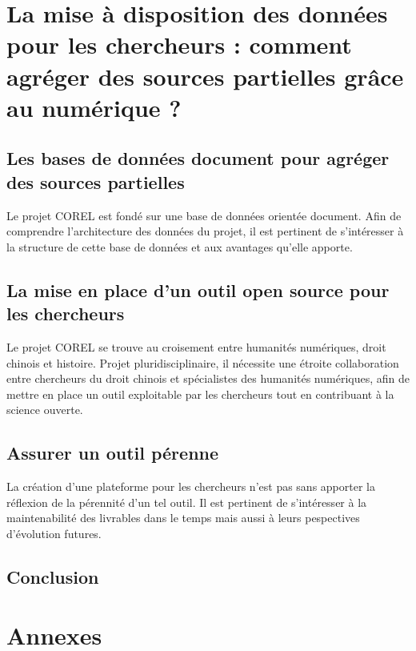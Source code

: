 \documentclass[a4paper,12pt,twoside]{book}
\newcommand{\COREL}{\gls{COREL}\xspace}
\newcommand{\clearemptydoublepage}{\newpage{\pagestyle{empty}\cleardoublepage}}
\newcommand\chapterNo[1]{
  \chapter*{#1}
  \markright{\MakeUppercase{#1}}
}
\begin{document}
    \part{La mise à disposition des données pour les chercheurs : comment agréger des sources partielles grâce au numérique ?}
    \chapter{Les bases de données document pour agréger des sources partielles}
    Le projet \COREL est fondé sur une base de données orientée document. Afin de comprendre l'architecture des données du projet, il est pertinent de s'intéresser à la structure de cette base de données et aux avantages qu'elle apporte.
                    
            
        \clearemptydoublepage
        
        \chapter{La mise en place d’un outil open source pour les chercheurs}
        Le projet \COREL se trouve au croisement entre humanités numériques, droit chinois et histoire. Projet pluridisciplinaire, il nécessite une étroite collaboration entre chercheurs du droit chinois et spécialistes des humanités numériques, afin de mettre en place un outil exploitable par les chercheurs tout en contribuant à la science ouverte.
                    
             
            
        \clearemptydoublepage
        
        \chapter{Assurer un outil pérenne}
        La création d'une plateforme pour les chercheurs n'est pas sans apporter la réflexion de la pérennité d'un tel outil. Il est pertinent de s'intéresser à la maintenabilité des livrables dans le temps mais aussi à leurs pespectives d'évolution futures. 
                    
             
            
        \clearemptydoublepage
    
    \chapterNo{Conclusion}
    \pagestyle{empty}
    

\appendix
    \part*{Annexes}	
    \pagestyle{empty}
    

\clearemptydoublepage

\backmatter
    \printacronyms[title=Liste des acronymes,toctitle=Acronymes]
    \listoffigures
    \printglossary 
    \printbibliography[keyword={institution}, title={Histoire des institutions}]
    \printbibliography[keyword={histoire}, title={Histoire du droit chinois}]
    \printbibliography[keyword={edition}, title={Édition scientifique numérique}]
    \tableofcontents
	
\end{document}
